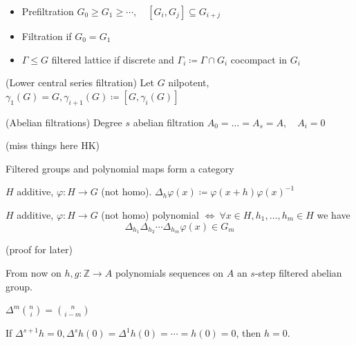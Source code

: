 \begin{definition}
\begin{itemize}[topsep=-6pt, itemsep=0pt]
    \item Prefiltration $G_0 \geq G_1 \geq \cdots , \quad  [G_i, G_j] \subseteq G_{i+j}$
    \item Filtration if $G_0 = G_1$
    \item $ \Gamma \leq G$ filtered lattice if discrete and $\Gamma _i \coloneqq \Gamma \cap G_i$ cocompact in $G_i$
\end{itemize}
\end{definition}

\begin{example} (Lower central series filtration) Let $G$ nilpotent, $\gamma _1(G) = G, \gamma _{i+1}(G) \coloneqq [G, \gamma _i(G)]$
\end{example}

\begin{example} (Abelian filtrations) Degree $s$ abelian filtration $A_0 = \ldots = A_s = A, \quad A_i = 0$
\end{example}

(miss things here HK)

\begin{theorem} Filtered groups and polynomial maps form a category
\end{theorem}

\begin{definition} $H$ additive, $\varphi : H \to G$ (not homo). $\Delta _h \varphi (x) \coloneqq \varphi (x + h) \varphi (x)^{-1}$
\end{definition}

\begin{theorem}
$H$ additive, $\varphi : H \to G$ (not homo) polynomial $ \Leftrightarrow \ \forall x \in H, h_1, \ldots, h_m \in H$ we have
\[
\Delta _{h_1} \Delta _{h_2} \cdots \Delta _{h_m} \varphi (x) \in G_m
\]
\end{theorem}

(proof for later)

From now on $h,g : \mathbb{Z} \to A$ polynomials sequences on $A$ an $s$-step filtered abelian group.

\begin{proposition}
$\Delta^m \binom{n}{i} = \binom{n}{i-m}$
\end{proposition}

\begin{proposition}
If $\Delta ^{s+1} h= 0, \Delta^s h(0)=\Delta ^1 h(0) = \cdots = h(0) = 0$, then $h = 0$.
\end{proposition}

